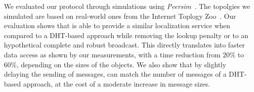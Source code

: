 
We evaluated our protocol through simulations using \textit{Peersim}~\cite{montresor2009peersim}. The topolgies we simulated are based on real-world ones from the Internet Toplogy
Zoo~\cite{topology-zoo}.  Our evaluation shows that \NAME is able to
provide a similar localization service when compared to a DHT-based
approach while removing the lookup penalty or to an hypothetical complete and robust broadcast. This directly translates
into faster data access as shown by our measurements, with a time
reduction from $20\%$ to $60\%$, depending on the sizes of the
objects. %
We also show that by slightly delaying the sending of messages, \NAME
can match the number of messages of a DHT-based approach, at the cost
of a moderate increase in message sizes.






